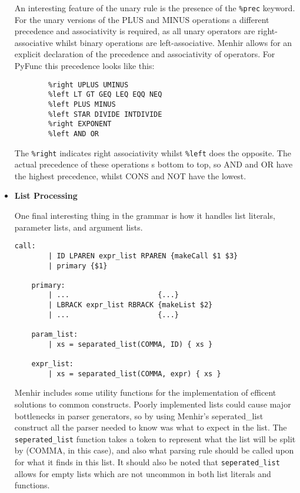 \documentclass{l4proj}
\begin{document}
\begin{itemize}
    An interesting feature of the unary rule is the presence of the \texttt{\%prec} keyword.
    For the unary versions of the PLUS and MINUS operations a different precedence and associativity is required, as all unary operators are right-associative whilst binary operations are left-associative.
    Menhir allows for an explicit declaration of the precedence and associativity of operators.
    For PyFunc this precedence looks like this:
    \begin{lstlisting}[caption=PyFunc's Menhir precedence and associativity declarations.]
        %right CONS NOT
        %right UPLUS UMINUS
        %left LT GT GEQ LEQ EQQ NEQ
        %left PLUS MINUS
        %left STAR DIVIDE INTDIVIDE
        %right EXPONENT
        %left AND OR
    \end{lstlisting}
    The \texttt{\%right} indicates right associativity whilst \texttt{\%left} does the opposite.
    The actual precedence of these operations s bottom to top, so AND and OR have the highest precedence, whilst CONS and NOT have the lowest.

    \item \textbf{List Processing}
    
    One final interesting thing in the grammar is how it handles list literals, parameter lists, and argument lists.
    \begin{lstlisting}[caption=PyFunc's Parser grammar for handling list literals.]
    call:
        | ID LPAREN expr_list RPAREN {makeCall $1 $3}
        | primary {$1}
    
    primary:
        | ...                     {...}
        | LBRACK expr_list RBRACK {makeList $2}
        | ...                     {...}

    param_list:
        | xs = separated_list(COMMA, ID) { xs }

    expr_list:
        | xs = separated_list(COMMA, expr) { xs }
    \end{lstlisting}

    Menhir includes some utility functions for the implementation of efficent solutions to common constructs.
    Poorly implemented lists could cause major bottlenecks in parser generators, so by using Menhir's seperated\_list construct all the parser needed to know was what to expect in the list.
    The \texttt{seperated\_list} function takes a token to represent what the list will be split by (COMMA, in this case), and also what parsing rule should be called upon for what it finds in this list.
    It should also be noted that \texttt{seperated\_list} allows for empty lists which are not uncommon in both list literals and functions.
\end{itemize}
\end{document}
